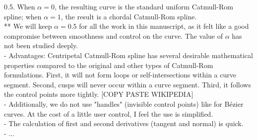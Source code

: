0.5. When $\alpha = 0$, the resulting curve is the standard uniform Catmull-Rom spline; when $\alpha = 1$, the result is a chordal Catmull-Rom spline. \\
** We will keep $\alpha = 0.5$ for all the work in this manuscript, as it felt like a good compromise between smoothness and control on the curve. The value of $\alpha$ has not been studied deeply. \\
- Advantages: Centripetal Catmull-Rom spline has several desirable mathematical properties compared to the original and other types of Catmull-Rom formulations. First, it will not form loops or self-intersections within a curve segment. Second, cusps will never occur within a curve segment. Third, it follows the control points more tightly. [COPY PASTE WIKIPEDIA] \\
- Additionally, we do not use "handles" (invisible control points) like for Bézier curves. At the cost of a little user control, I feel the use is simplified. \\
- The calculation of first and second derivatives (tangent and normal) is quick. \\
- ...